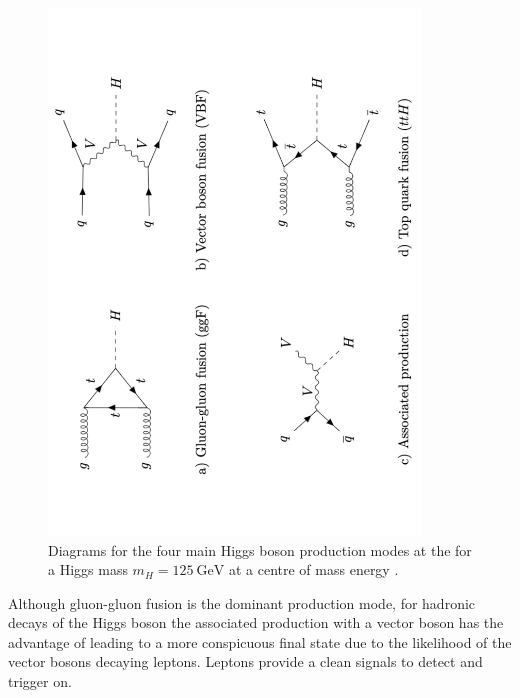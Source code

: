 \begin{figure}[!htbp]
  \centering
  \includegraphics[angle=-90,width=0.88\textwidth]{chapters/1.theory/figs/higgs_prod.pdf}
  \caption{
    Diagrams for the four main Higgs boson production modes at the \LHC for a Higgs mass $m_H = \SI{125}{\GeV}$ at a centre of mass energy .
  }
  \label{fig:higgs_prod}
\end{figure}

Although gluon-gluon fusion is the dominant production mode, for hadronic decays of the Higgs boson the associated production with a vector boson has the advantage of leading to a more conspicuous final state due to the likelihood of the vector bosons decaying leptons.
Leptons provide a clean signals to detect and trigger on.

